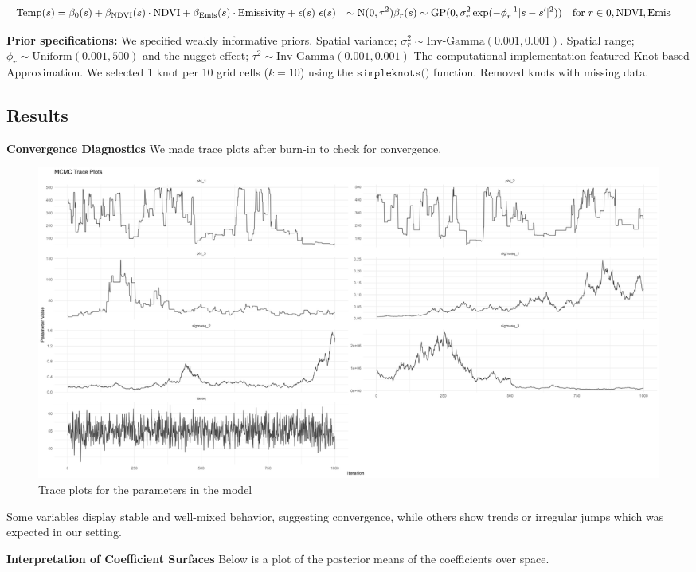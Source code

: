 \begin{align}
\text{Temp}(s) &= \beta_0(s) + \beta_{\text{NDVI}}(s)\cdot\text{NDVI} + \beta_{\text{Emis}}(s)\cdot\text{Emissivity} + \epsilon(s) \
\epsilon(s) &\sim \text{N}(0, \tau^2) \newline
\beta_r(s) &\sim \text{GP}(0, \sigma_r^2 \exp(-\phi_r^{-1}|s-s'|^2)) \quad \text{for } r \in {0, \text{NDVI}, \text{Emis}}
\end{align}

\textbf{Prior specifications:} We specified weakly informative priors. Spatial variance; $\sigma_r^2 \sim \text{Inv-Gamma}(0.001, 0.001)$.   Spatial range; $\phi_r \sim \text{Uniform}(0.001, 500)$ and  the nugget effect; $\tau^2 \sim \text{Inv-Gamma}(0.001, 0.001)$ \newline
The computational implementation featured Knot-based Approximation. We selected 1 knot per 10 grid cells ($k=10$) using the  $\texttt{simpleknots()}$ function. Removed knots with missing data.
\subsection{Results}
\textbf{Convergence Diagnostics}\newline
We made trace plots after burn-in to check for convergence. 

\begin{figure}[h]
 \centering
 \includegraphics[width=\textwidth]{../../figures/traceplots.png}
 \caption{Trace plots for the parameters in the model}
 \label{fig:traceplots}
 \end{figure}
Some variables display stable and well-mixed behavior, suggesting convergence, while others show trends or irregular jumps which was expected in our setting.

\textbf{Interpretation of Coefficient Surfaces} \newline
Below is a plot of the posterior means of the coefficients over space.

